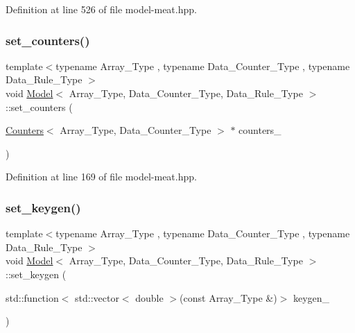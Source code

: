 Definition at line 526 of file model-\/meat.\+hpp.

\mbox{\label{class_model_aab2ba8c90b888cfa2143bccf42fcb89f}} 
\subsubsection{\texorpdfstring{set\+\_\+counters()}{set\_counters()}}
{\footnotesize\ttfamily template$<$typename Array\+\_\+\+Type , typename Data\+\_\+\+Counter\+\_\+\+Type , typename Data\+\_\+\+Rule\+\_\+\+Type $>$ \\
void \hyperlink{class_model}{Model}$<$ Array\+\_\+\+Type, Data\+\_\+\+Counter\+\_\+\+Type, Data\+\_\+\+Rule\+\_\+\+Type $>$\+::set\+\_\+counters (\begin{DoxyParamCaption}\item[{\hyperlink{class_counters}{Counters}$<$ Array\+\_\+\+Type, Data\+\_\+\+Counter\+\_\+\+Type $>$ $\ast$}]{counters\+\_\+ }\end{DoxyParamCaption})\hspace{0.3cm}{\ttfamily [inline]}}



Definition at line 169 of file model-\/meat.\+hpp.

\mbox{\label{class_model_add1847cdaf3f5bbde6c14efc2e4d16df}} 
\subsubsection{\texorpdfstring{set\+\_\+keygen()}{set\_keygen()}}
{\footnotesize\ttfamily template$<$typename Array\+\_\+\+Type , typename Data\+\_\+\+Counter\+\_\+\+Type , typename Data\+\_\+\+Rule\+\_\+\+Type $>$ \\
void \hyperlink{class_model}{Model}$<$ Array\+\_\+\+Type, Data\+\_\+\+Counter\+\_\+\+Type, Data\+\_\+\+Rule\+\_\+\+Type $>$\+::set\+\_\+keygen (\begin{DoxyParamCaption}\item[{std\+::function$<$ std\+::vector$<$ double $>$(const Array\+\_\+\+Type \&)$>$}]{keygen\+\_\+ }\end{DoxyParamCaption})\hspace{0.3cm}{\ttfamily [inline]}}



